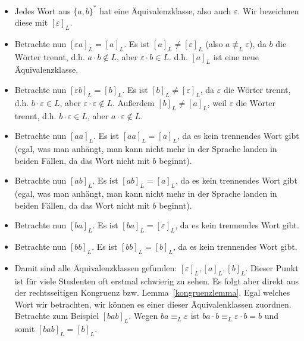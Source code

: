 \documentclass[11pt, a4paper]{article}
\theoremstyle{definition}
\theoremstyle{plain}
\begin{document}
\begin{itemize}
	\item Jedes Wort aus \( \{ a, b \}^\ast \) hat eine Äquivalenzklasse, also auch \( \varepsilon \). Wir bezeichnen diese mit \( [\varepsilon]_L \).
	\item Betrachte nun \( [\varepsilon a]_L = [a]_L \). Es ist \( [a]_L \neq [\varepsilon]_L \) (also \( a \not\equiv_L \varepsilon \)), da \( b \) die Wörter trennt, d.h. \( a \cdot b \notin L \), aber \( \varepsilon \cdot b \in L \). d.h. \( [a]_L \) ist eine neue Äquivalenzklasse.
	\item Betrachte nun \( [\varepsilon b]_L = [b]_L \). Es ist \( [b]_L \neq [\varepsilon]_L \), da \( \varepsilon \) die Wörter trennt, d.h. \( b \cdot \varepsilon \in L \), aber \( \varepsilon \cdot \varepsilon \notin L \). Außerdem \( [b]_L \neq [a]_L \), weil \( \varepsilon \) die Wörter trennt, d.h. \( b \cdot \varepsilon \in L \), aber \( a \cdot \varepsilon \notin L \).
	\item Betrachte nun \( [aa]_L \). Es ist \( [aa]_L = [a]_L \), da es kein trennendes Wort gibt (egal, was man anhängt, man kann nicht mehr in der Sprache landen in beiden Fällen, da das Wort nicht mit \( b \) beginnt).
	\item Betrachte nun \( [ab]_L \). Es ist \( [ab]_L = [a]_L \), da es kein trennendes Wort gibt (egal, was man anhängt, man kann nicht mehr in der Sprache landen in beiden Fällen, da das Wort nicht mit \( b \) beginnt).
	\item Betrachte nun \( [ba]_L \). Es ist \( [ba]_L = [\varepsilon]_L \), da es kein trennendes Wort gibt.
	\item Betrachte nun \( [bb]_L \). Es ist \( [bb]_L = [b]_L \), da es kein trennendes Wort gibt.
	\item Damit sind alle Äquivalenzklassen gefunden: \( [\varepsilon]_L, [a]_L, [b]_L \). Dieser Punkt ist für viele Studenten oft erstmal schwierig zu sehen. Es folgt aber direkt aus der rechtsseitigen Kongruenz bzw. Lemma~\ref{kongruenzlemma}. Egal welches Wort wir betrachten, wir können es einer dieser Äquivalenklassen zuordnen. Betrachte zum Beispiel \( [bab]_L \). Wegen \( ba \equiv_L \varepsilon \) ist \( ba \cdot b \equiv_L \varepsilon \cdot b = b \) und somit \( [bab]_L = [b]_L \). 
\end{itemize}
\end{document}
